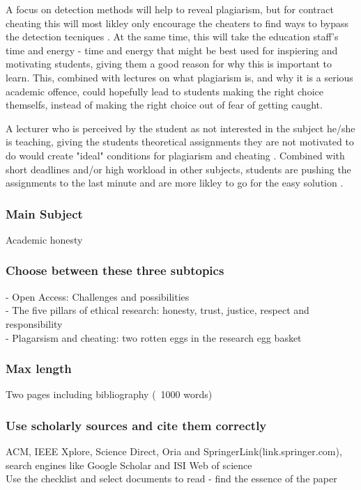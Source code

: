 \documentclass[10pt,a4paper]{article}
\begin{document}
A focus on detection methods will help to reveal plagiarism, but for contract cheating this will most likley only encourage the cheaters to find ways to bypass the detection tecniques \cite{Walker2012}. At the same time, this will take the education staff's time and energy - time and energy that might be best used for inspiering and motivating students, giving them a good reason for why this is important to learn. This, combined with lectures on what plagiarism is, and why it is a serious academic offence, could hopefully lead to students making the right choice themselfs, instead of making the right choice out of fear of getting caught.

A lecturer who is perceived by the student as not interested in the subject he/she is teaching, giving the students theoretical assignments they are not motivated to do would create "ideal" conditions for plagiarism and cheating \cite{Comas2010}. Combined with short deadlines and/or high workload in other subjects, students are pushing the assignments to the last minute and are more likley to go for the easy solution \cite{Comas2010}. 


\clearpage

\subsubsection*{Main Subject}
Academic honesty

\subsubsection*{Choose between these three subtopics}

- Open Access: Challenges and possibilities\\
- The five pillars of ethical research: honesty, trust, justice, respect and responsibility\\
- Plagarsism and cheating: two rotten eggs in the research egg basket
\subsubsection*{Max length}
Two pages including bibliography (~1000 words)
\subsubsection*{Use scholarly sources and cite them correctly}
ACM, IEEE Xplore, Science Direct, Oria and SpringerLink(link.springer.com), search engines like Google Scholar and ISI Web of science\\
Use the checklist and select documents to read - find the essence of the paper
\end{document}

